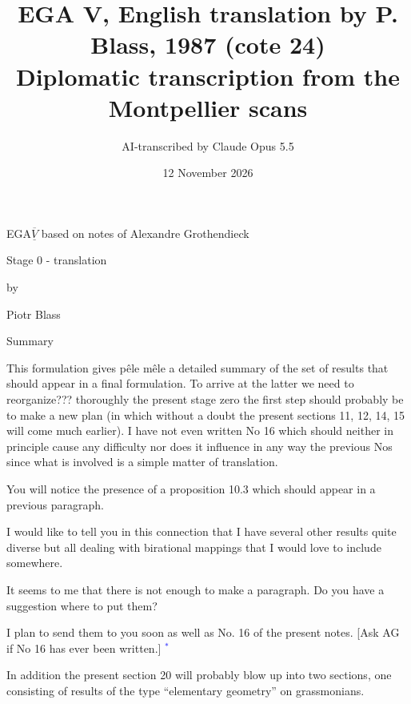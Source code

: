 \documentclass[11pt]{article}
\title{EGA V, English translation by P. Blass, 1987 (cote 24)\\[4pt]\large Diplomatic transcription from the Montpellier scans}
\author{AI-transcribed by Claude Opus 5.5}
\date{12 November 2026}
\newcommand{\scanpage}[1]{\par\bigskip\noindent{\small\sffamily[scan #1]}\par}
\newcommand{\mspage}[1]{{\small\sffamily[p.\,#1]}}
\newcommand{\hand}[1]{\textcolor{blue}{#1}}
\begin{document}
\maketitle

\scanpage{24/1}
\mspage{1}

EGA$\overline{\underline{V}}$ based on notes of
Alexandre Grothendieck

Stage 0 - translation

by

Piotr Blass

\clearpage
\scanpage{24/2}
\mspage{2}

Summary

This formulation gives pêle mêle a detailed summary of the
set of results that should appear in a final formulation. To
arrive at the latter we need to reorganize??? thoroughly the
present stage zero the first step should probably be to make a new
plan (in which without a doubt the present sections 11, 12, 14, 15
will come much earlier). I have not even written No 16 which
should neither in principle cause any difficulty nor does it
influence in any way the previous Nos since what is involved is a
simple matter of translation.

You will notice the presence of a proposition 10.3 which
should appear in a previous paragraph.

I would like to tell you in this connection that I have
several other results quite diverse but all dealing with
birational mappings that I would love to include somewhere.

It seems to me that there is not enough to make a paragraph.
Do you have a suggestion where to put them?

I plan to send them to you soon as well as No. 16 of the
present notes. [Ask AG if No 16 has ever been written.] \hand{$^{*}$}

In addition the present section 20 will probably blow up into
two sections, one consisting of results of the type ``elementary
geometry'' on grassmonians.
\end{document}
